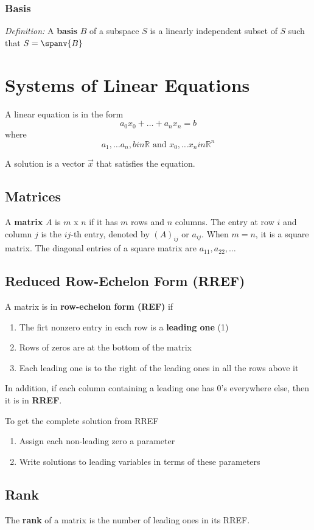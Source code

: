 \documentclass[12pt]{article}
\newcommand{\R}[1]{\mathbb{R}^{#1}}
\begin{document}
\subsubsection*{Basis}
\textit{Definition:} A {\bf basis} $B$ of a subspace $S$ is a linearly independent subset of $S$ such that $S = \spanv{B}$

\section*{Systems of Linear Equations}
A linear equation is in the form \[ a_0x_0 + \dots + a_nx_n = b \] where \[ a_1,\dots a_n, bin\mathbb{R} \text{ and } x_0,\dots x_nin\R{n} \]

A solution is a vector $\vec{x}$ that satisfies the equation.

\subsection*{Matrices}
A {\bf matrix} $A$ is $m$ x $n$ if it has $m$ rows and $n$ columns. The entry at row $i$ and column $j$ is the $ij$-th entry, denoted by $(A)_{ij}$ or $a_{ij}$. When $m=n$, it is a square matrix. The diagonal entries of a square matrix are $a_{11}, a_{22}, \dots $

\subsection*{Reduced Row-Echelon Form (RREF)}
A matrix is in {\bf row-echelon form (REF)} if
\begin{enumerate}
\item The firt nonzero entry in each row is a {\bf leading one} (1)
\item Rows of zeros are at the bottom of the matrix
\item Each leading one is to the right of the leading ones in all the rows above it
\end{enumerate}

In addition, if each column containing a leading one has 0's everywhere else, then it is in {\bf RREF}.

To get the complete solution from RREF
\begin{enumerate}
\item Assign each non-leading zero a parameter
\item Write solutions to leading variables in terms of these parameters
\end{enumerate}

\subsection*{Rank}
The {\bf rank} of a matrix is the number of leading ones in its RREF.
\end{document}
